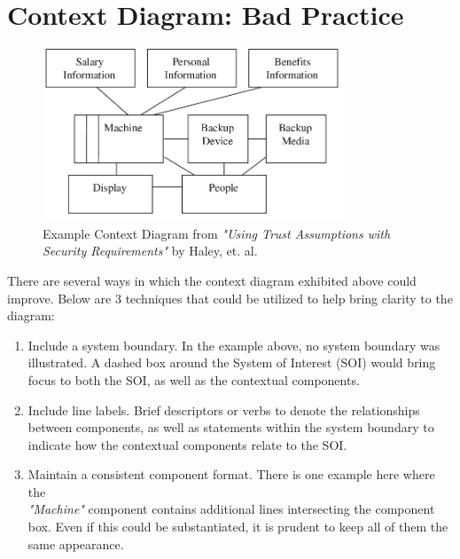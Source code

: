 \documentclass{article}
\begin{document}
\section*{Context Diagram: Bad Practice}
\begin{figure}[htp]
    \centering
    \includegraphics[width=9cm]{bad-exp.png}
    \caption{Example Context Diagram from \textit{"Using Trust Assumptions with Security Requirements"} by Haley, et. al.\cite{Haley}}
    \label{fig:bad}
\end{figure}

There are several ways in which the context diagram exhibited above could improve. Below are 3 techniques that could be utilized to help bring clarity to the diagram:
\begin{enumerate}
    \item Include a system boundary. In the example above, no system boundary was illustrated. A dashed box around the System of Interest (SOI) would bring focus to both the SOI, as well as the contextual components.
    \item Include line labels. Brief descriptors or verbs to denote the relationships between components, as well as statements within the system boundary to indicate how the contextual components relate to the SOI.
    \item Maintain a consistent component format. There is one example here where the\\ \textit{"Machine"} component contains additional lines intersecting the component box. Even if this could be substantiated, it is prudent to keep all of them the same appearance.
\end{enumerate}

\newpage


\end{document}
